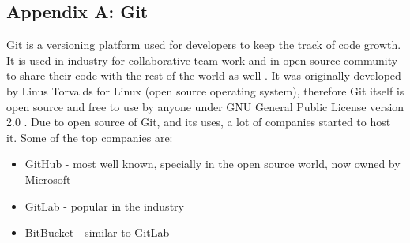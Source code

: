 \subsection{Appendix A: Git}
Git is a versioning platform used for developers to keep the track of code growth. It is used in industry for collaborative team work and in open source community to share their code with the rest of the world as well \parencite{spinellis2012git}. 
\newline
It was originally developed by Linus Torvalds for Linux (open source operating system), therefore Git itself is open source and free to use by anyone under GNU General Public License version 2.0 \parencite{web:AboutGit}.
\newline
Due to open source of Git, and its uses, a lot of companies started to host it. Some of the top companies are: 
\begin{itemize}
  \item GitHub - most well known, specially in the open source world, now owned by Microsoft
  \item GitLab - popular in the industry 
  \item BitBucket - similar to GitLab
\end{itemize}